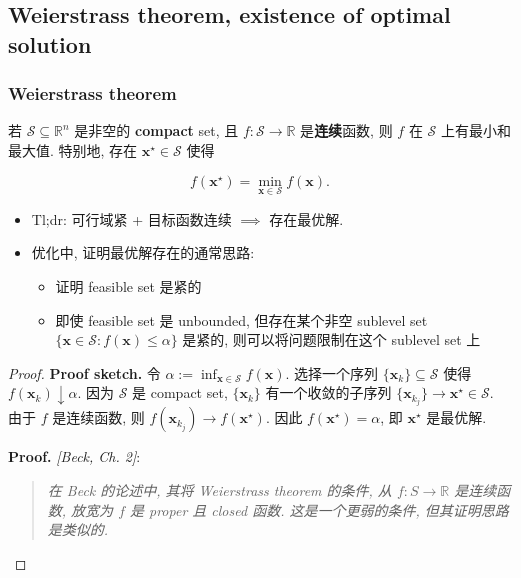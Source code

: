 \subsection{Weierstrass theorem, existence of optimal solution}

\subsubsection{Weierstrass theorem}


\begin{thmblock}[{Weierstrass}]
若 $\mathcal{S} \subseteq \mathbb{R}^n$ 是非空的 \textbf{compact} set, 且 $f: \mathcal{S} \to \mathbb{R}$ 是\textbf{连续}函数, 则 $f$ 在 $\mathcal{S}$ 上有最小和最大值. 特别地, 存在 $\bm{x}^\star \in \mathcal{S}$ 使得

\[
f(\bm{x}^\star) = \min_{\bm{x} \in \mathcal{S}} f(\bm{x}).
\]

\begin{itemize}
\item {}Tl;dr: 可行域紧 + 目标函数连续 $\implies$ 存在最优解.


\item {}优化中, 证明最优解存在的通常思路:

\begin{itemize}
\item {}证明 feasible set 是紧的


\item {}即使 feasible set 是 unbounded, 但存在某个非空 sublevel set $\{\bm{x} \in \mathcal{S}: f(\bm{x}) \leq \alpha\}$ 是紧的, 则可以将问题限制在这个 sublevel set 上


\end{itemize}


\end{itemize}


\begin{proof}{}
\textbf{Proof sketch.} 令 $\alpha := \inf_{\bm{x} \in \mathcal{S}} f(\bm{x})$. 选择一个序列 $\{\bm{x}_k\} \subseteq \mathcal{S}$ 使得 $f(\bm{x}_k) \downarrow \alpha$. 因为 $\mathcal{S}$ 是 compact set, $\{\bm{x}_k\}$ 有一个收敛的子序列 $\{\bm{x}_{k_j}\} \to \bm{x}^\star \in \mathcal{S}$. 由于 $f$ 是连续函数, 则 $f(\bm{x}_{k_j}) \to f(\bm{x}^\star)$. 因此 $f(\bm{x}^\star) = \alpha$, 即 $\bm{x}^\star$ 是最优解.

\textbf{Proof.} \emph{[Beck, Ch. 2]}:

\begin{quote}
\emph{在 Beck 的论述中, 其将 Weierstrass theorem 的条件, 从 $f: S \to \mathbb{R}$ 是连续函数, 放宽为 $f$ 是 proper 且 closed 函数. 这是一个更弱的条件, 但其证明思路是类似的.}


\end{quote}
\end{proof}
\end{thmblock}
